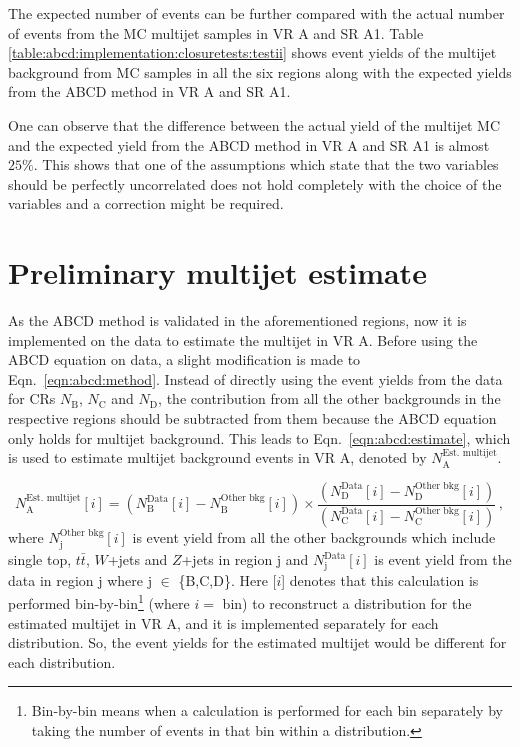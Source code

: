 The expected number of events can be further compared with the actual number of events from the MC multijet samples in VR A and SR A1. Table \ref{table:abcd:implementation:closuretests:testii} shows event yields of the multijet background from MC samples in all the six regions along with the expected yields from the ABCD method in VR A and SR A1.

One can observe that the difference between the actual yield of the multijet MC and the expected yield from the ABCD method in VR A and SR A1 is almost $25\%$. This shows that one of the assumptions which state that the two variables should be perfectly uncorrelated does not hold completely with the choice of the variables and a correction might be required.
\section{Preliminary multijet estimate}
\label{sec:abcd:estimate}
As the ABCD method is validated in the aforementioned regions, now it is implemented on the data to estimate the multijet in VR A. Before using the ABCD equation on data, a slight modification is made to Eqn.\ \ref{eqn:abcd:method}. Instead of directly using the event yields from the data for CRs $N_{\text{B}}$, $N_{\text{C}}$ and $N_{\text{D}}$, the contribution from all the other backgrounds in the respective regions should be subtracted from them because the ABCD equation only holds for multijet background. This leads to Eqn.\ \ref{eqn:abcd:estimate}, which is used to estimate multijet background events in VR A, denoted by $N_{\text{A}}^{\text{Est.\ multijet}}$.

\begin{equation}
	N_{\text{A}}^{\text{Est.\ multijet}}[i] = (N_{\text{B}}^{\text{Data}}[i]-N_{\text{B}}^{\text{Other bkg}}[i]) \times \frac{(N_{\text{D}}^{\text{Data}}[i]-N_{\text{D}}^{\text{Other bkg}}[i])}{(N_{\text{C}}^{\text{Data}}[i]-N_{\text{C}}^{\text{Other bkg}}[i])} \,,
\label{eqn:abcd:estimate}
\end{equation}
where $N_{\text{j}}^{\text{Other bkg}}[i]$ is event yield from all the other backgrounds which include single top, $t\bar{t}$, $W$+jets and $Z$+jets in region j and $N_{\text{j}}^{\text{Data}}[i]$ is event yield from the data in region j where j $\in$ \{B,C,D\}. Here [$i$] denotes that this calculation is performed bin-by-bin\footnote{Bin-by-bin means when a calculation is performed for each bin separately by taking the number of events in that bin within a distribution.} (where $i=$ bin) to reconstruct a distribution for the estimated multijet in VR A, and it is implemented separately for each distribution. So, the event yields for the estimated multijet would be different for each distribution.

